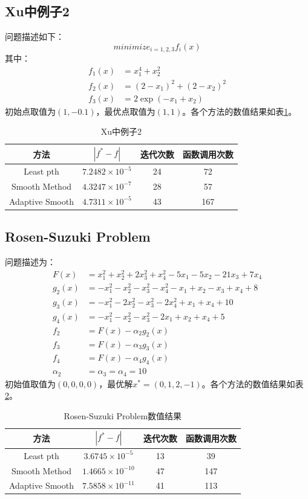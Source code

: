 \documentclass{ctexart}
\begin{document}
\subsection{Xu\cite{Xu2001}中例子2}
问题描述如下：
\[minimize_{i=1,2,3}f_i(x)\]
其中：
$$
\begin{aligned}
	f_1(x) &= x_1^4+x_2^2\\
	f_2(x) &= (2-x_1)^2 + (2-x_2)^2\\
	f_3(x) &= 2\exp(-x_1+x_2)
\end{aligned}$$
初始点取值为$(1,-0.1)$，最优点取值为$(1,1)$。各个方法的数值结果如表\ref{tab:xu2}。
\begin{table}[htpb]
	\centering
	\caption{Xu中例子2}
	\label{tab:xu2}
	\begin{tabular}{c c c c}
	\hline
	方法 & $|f^*-f|$ & 迭代次数 & 函数调用次数 \\\hline
	Least pth & $7.2482\times 10^{-5}$ & 24 & 72 \\
	Smooth Method & $4.3247\times 10^{-7}$ &28 & 57\\
	Adaptive Smooth & $4.7311\times 10^{-5}$ & 43 & 167 \\
	\hline
	\end{tabular}
\end{table}
\subsection{Rosen-Suzuki Problem}
问题描述为：
$$\begin{aligned}
	F(x)&=x_1^2+x_2^2+2x_3^2+x_4^2-5x_1-5x_2-21x_3+7x_4\\
	g_2(x)&=-x_1^2-x_2^2-x_3^2-x_4^2-x_1+x_2-x_3+x_4+8\\
	g_3(x)&=-x_1^2-2x_2^2-x_3^2-2x_4^2+x_1+x_4+10\\
	g_4(x)&=-x_1^2-x_2^2-x_3^2-2x_1+x_2+x_4+5\\
	f_2&=F(x)-\alpha_2g_2(x)\\
	f_3&=F(x)-\alpha_3g_3(x)\\
	f_4&=F(x)-\alpha_4g_4(x)\\
	\alpha_2&=\alpha_3=\alpha_4=10
\end{aligned}$$
初始值取值为$(0,0,0,0)$，最优解$x^*=(0,1,2,-1)$。各个方法的数值结果如表\ref{tab:rspro}。
\begin{table}[htpb]
	\centering
	\caption{Rosen-Suzuki Problem数值结果}
	\label{tab:rspro}
	\begin{tabular}{c c c c}
	\hline
	方法 & $|f^*-f|$ & 迭代次数 & 函数调用次数 \\\hline
	Least pth & $3.6745\times 10^{-5}$ & 13 & 39\\
	Smooth Method & $1.4665\times 10^{-10}$ & 47 & 147\\
	Adaptive Smooth & $7.5858\times 10^{-11}$ &41 &113 \\
	\hline
	\end{tabular}
\end{table}
\end{document}
